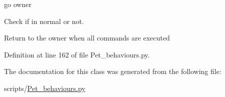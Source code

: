 go owner 

Check if in normal or not.

Return to the owner when all commands are executed 

Definition at line 162 of file Pet\+\_\+behaviours.\+py.



The documentation for this class was generated from the following file\+:\begin{DoxyCompactItemize}
\item 
scripts/\hyperlink{Pet__behaviours_8py}{Pet\+\_\+behaviours.\+py}\end{DoxyCompactItemize}
